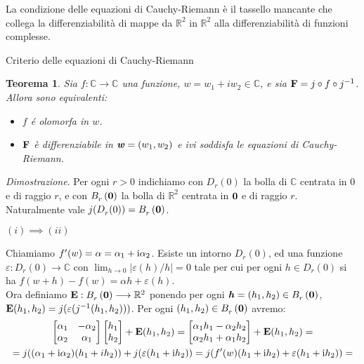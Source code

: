 \documentclass[11pt]{book}
\makeatletter
\theoremstyle{Definizione}
\theoremstyle{TeoremaProposizioneLemmaCorollarioCongettura}
\newtheorem{myteo}{Teorema}[section]
\theoremstyle{OsservazioneNotaEsempio}
\renewenvironment{proof}[1][\proofname]{\par
  \normalfont \topsep6\p@\@plus6\p@\relax
  \trivlist
  \item[\hskip\labelsep
        \itshape
    #1\@addpunct{.}]\ignorespaces
}{%
  \endtrivlist\@endpefalse
}
\renewenvironment{proof}{\textsl{Dimostrazione}.}{}
\newcommand{\R}{\mathbb{R}}
\newcommand{\C}{\mathbb{C}}
\newcommand{\Ball}[3][]{B^{#1}_{{#2}}\left({#3}\right)}
\newcommand{\Disc}[3][]{D^{#1}_{{#2}}({#3})}
\newcommand{\gro}[1]{\textbf{\textup{#1}}}
\newcommand{\gri}[1]{\textbf{\textit{{#1}}}}
\renewcommand{\i}{\textup{i}}
\makeatother
\begin{document}
La condizione delle equazioni di Cauchy-Riemann è il tassello mancante che collega la differenziabilità di mappe da $\R^2$ in $\R^2$ alla differenziabilità di funzioni complesse.
\begin{boxteo}{Criterio delle equazioni di Cauchy-Riemann}
\begin{myteo}
Sia $f:\C \longrightarrow \C$ una funzione, $w = w_1+iw_2\in \C$, e sia $\gro{F} = j \circ f \circ j^{-1}$. Allora sono equivalenti:
\begin{itemize}
\item[$(i)$] $f$ é olomorfa in $w$.
\item[$(ii)$] $\gro{F}$ è differenziabile in $\gri{w} = (w_1,w_2)$ e ivi soddisfa le equazioni di Cauchy-Riemann.
\end{itemize}
\end{myteo}
\tcblower
\begin{proof}
Per ogni $r > 0$ indichiamo con $\Disc{r}{0}$ la bolla di $\C$ centrata in $0$ e di raggio $r$, e con $\Ball{r}{\gro{0}}$ la bolla di $\R^2$ centrata in $\gro{0}$ e di raggio $r$. Naturalmente vale $j(\Disc{r}{0}) = \Ball{r}{\gro{0}}$.
\begin{flushleft}
$(i) \implies (ii)$
\end{flushleft}
Chiamiamo $f'(w) = \alpha = \alpha_1+\i\alpha_2$. Esiste un intorno $\Disc{r}{0}$, ed una funzione $\varepsilon:\Disc{r}{0}\longrightarrow \C$ con $\lim_{h \to 0} |\varepsilon(h)/h| = 0$ tale per cui per ogni $h\in \Disc{r}{0}$ si ha $f(w+h)-f(w) = \alpha h + \varepsilon(h)$.\\
Ora definiamo $\gro{E}:\Ball{r}{\gro{0}}\longrightarrow \R^2$ ponendo per ogni $\gri{h} = (h_1,h_2)\in \Ball{r}{\gro{0}}$, $\gro{E}(h_1,h_2) = j(\varepsilon(j^{-1}(h_1,h_2)))$. Per ogni $(h_1,h_2)\in \Ball{r}{\gro{0}}$ avremo:
\begin{multline*}
\begin{bmatrix}
\alpha_1 & -\alpha_2 \\
\alpha_2 & \alpha_1
\end{bmatrix}\begin{bmatrix}
h_1 \\ 
h_2
\end{bmatrix} + \gro{E}(h_1,h_2) = \begin{bmatrix}
\alpha_1 h_1 - \alpha_2 h_2 \\
\alpha_2 h_1 + \alpha_1 h_2
\end{bmatrix}+ \gro{E}(h_1,h_2) = \\
= j((\alpha_1+\i\alpha_2)(h_1+ih_2)) + j(\varepsilon(h_1+\i h_2)) = j(f'(w)(h_1+\i h_2)+\varepsilon(h_1+\i h_2)) = \\

\end{multline*}
\end{proof}
\end{boxteo}
\end{document}
